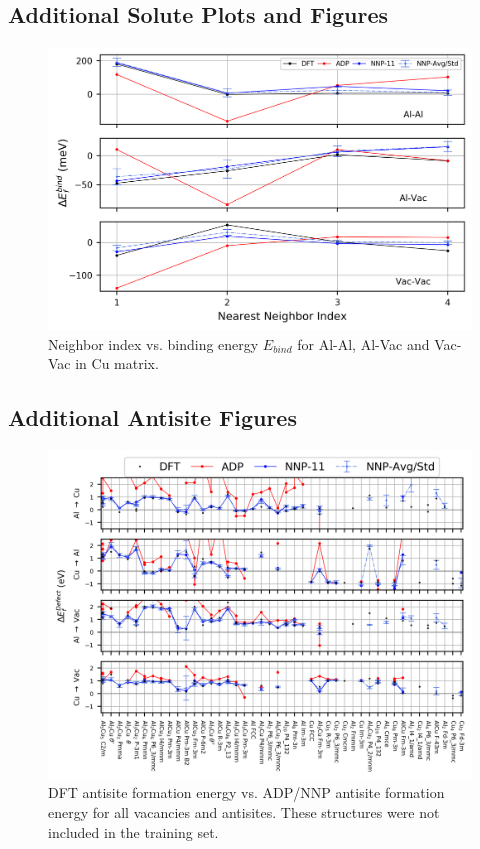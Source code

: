 \documentclass{article}
\begin{document}
\subsection{Additional Solute Plots and Figures} \label{apd_sct:adn_solsol}

\begin{figure}[H]%
\centering%
\includegraphics[width=1\textwidth,center]{./figures/solsol_in_cu.png}%
\caption{Neighbor index vs. binding energy $E_{bind}$ for Al-Al, Al-Vac and Vac-Vac in Cu matrix.}%
\label{fig:solsol_in_cu}
\end{figure}

\subsection{Additional Antisite Figures} \label{apd_sct:adn_antisites}
\begin{figure}[H]%
\centering%
\includegraphics[width=1\textwidth,center]{figures/antisite_vacancies_allsites.png}%
\caption{DFT antisite formation energy vs. ADP/NNP antisite formation energy
for all vacancies and antisites.
These structures were not included in the training set.}%
\label{fig:antisite_plot_all}
\end{figure}
\end{document}
